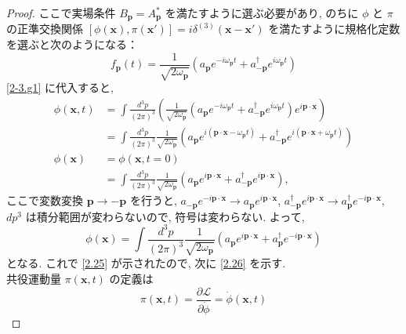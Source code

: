 \documentclass[a4paper,12pt]{article}
\begin{document}
\begin{proof}
ここで実場条件 $B_{\mathbf{p}} = A_{\mathbf{p}}^*$ を満たすように選ぶ必要があり, のちに $\phi$ と $\pi$ の正準交換関係 $[\phi(\mathbf{x}), \pi(\mathbf{x}')] = i\delta^{(3)}(\mathbf{x} - \mathbf{x}')$ を満たすように規格化定数を選ぶと次のようになる：
\begin{equation*}
    f_{\mathbf{p}}(t) = \frac{1}{\sqrt{2\omega_{\mathbf{p}}}} \left( a_{\mathbf{p}} e^{-i\omega_{\mathbf{p}}t} + a^\dagger_{-\mathbf{p}} e^{i\omega_{\mathbf{p}}t} \right) \tag{2-3.g9}
\end{equation*}
\eqref{2-3.g1} に代入すると,
\begin{align*}
    \phi(\mathbf{x}, t) &= \int \frac{d^3p}{(2\pi)^3} \left( \frac{1}{\sqrt{2\omega_{\mathbf{p}}}} \left( a_{\mathbf{p}} e^{-i\omega_{\mathbf{p}}t} + a^\dagger_{-\mathbf{p}} e^{i\omega_{\mathbf{p}}t} \right) e^{i\mathbf{p}\cdot\mathbf{x}} \right) \tag{2-3.g10}\\
    &= \int \frac{d^3p}{(2\pi)^3} \frac{1}{\sqrt{2\omega_{\mathbf{p}}}} \left( a_{\mathbf{p}} e^{i(\mathbf{p}\cdot\mathbf{x} - \omega_{\mathbf{p}}t)} + a^\dagger_{-\mathbf{p}} e^{i(\mathbf{p}\cdot\mathbf{x} + \omega_{\mathbf{p}}t)} \right) \tag{2-3.g11}\\
    \phi(\mathbf{x}) &= \phi(\mathbf{x}, t = 0) \tag{2-3.g12} \\
    &= \int \frac{d^3p}{(2\pi)^3} \frac{1}{\sqrt{2\omega_{\mathbf{p}}}} \left( a_{\mathbf{p}} e^{i\mathbf{p}\cdot\mathbf{x}} + a^\dagger_{-\mathbf{p}} e^{i\mathbf{p}\cdot\mathbf{x}} \right), \tag{2-3.g13}
\end{align*}
ここで変数変換 $\mathbf{p} \to -\mathbf{p}$ を行うと, $a_{-\mathbf{p}} e^{-i\mathbf{p}\cdot\mathbf{x}} \to a_{\mathbf{p}} e^{i\mathbf{p}\cdot\mathbf{x}}$, $a^\dagger_{-\mathbf{p}} e^{i\mathbf{p}\cdot\mathbf{x}} \to a^\dagger_{\mathbf{p}} e^{-i\mathbf{p}\cdot\mathbf{x}}$, $dp^3$ は積分範囲が変わらないので, 符号は変わらない. よって,
\begin{equation*}
    \phi(\mathbf{x}) = \int \frac{d^3p}{(2\pi)^3} \frac{1}{\sqrt{2\omega_{\mathbf{p}}}} \left( a_{\mathbf{p}} e^{i\mathbf{p}\cdot\mathbf{x}} + a^\dagger_{\mathbf{p}} e^{-i\mathbf{p}\cdot\mathbf{x}} \right) \tag{2-3.g14}
\end{equation*}
となる. これで \eqref{2.25} が示されたので, 次に \eqref{2.26} を示す.\\
共役運動量 $\pi(\mathbf{x}, t)$ の定義は
\begin{equation*}
    \pi(\mathbf{x}, t) = \frac{\partial \mathcal{L}}{\partial \dot{\phi}} = \dot{\phi}(\mathbf{x}, t) \tag{2-3.g15}
\end{equation*}

\end{proof}
\end{document}
